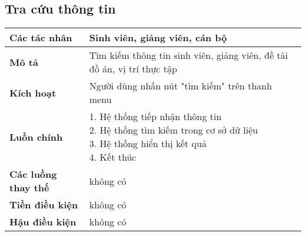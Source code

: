 \subsection*{Tra cứu thông tin}
	\begin{tabular}{|l|p{}|}
		\hline
		\textbf{Các tác nhân}         & Sinh viên, giảng viên, cán bộ                     \\
		\hline
		\textbf{Mô tả}                & Tìm kiếm thông tin sinh viên, giảng viên, đề tài đồ án, vị trí thực tập \\
		\hline
		\textbf{Kích hoạt}            & Người dùng nhấn nút "tìm kiếm" trên thanh menu                          \\
		\hline
		\textbf{Luồn chính}           & \makecell[l]{1. Hệ thống tiếp nhận thông tin                            \\ 2. Hệ thống tìm kiếm trong cơ sở dữ liệu \\ 3. Hệ thống hiển thị kết quả \\ 4. Kết thúc} \\
		\hline
		\textbf{Các luồng thay thế}   & không có                                                                \\
		\hline
		\textbf{Tiền điều kiện}       & không có                                                                \\
		\hline
		\textbf{Hậu điều kiện}        & không có                                                                \\
		\hline
	\end{tabular}

